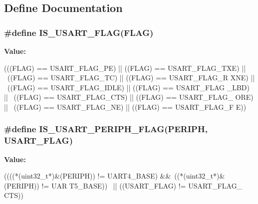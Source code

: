 \subsection{Define Documentation}
\hypertarget{group__USART__Flags_ga3e20747ce7c97a36718933c0cb3dac29}{
\subsubsection[{IS\_\-USART\_\-FLAG}]{\setlength{\rightskip}{0pt plus 5cm}\#define IS\_\-USART\_\-FLAG(FLAG)}}
\label{group__USART__Flags_ga3e20747ce7c97a36718933c0cb3dac29}
{\bfseries Value:}
\begin{DoxyCode}
(((FLAG) == USART_FLAG_PE) || ((FLAG) == USART_FLAG_TXE) || \
                             ((FLAG) == USART_FLAG_TC) || ((FLAG) == USART_FLAG_R
      XNE) || \
                             ((FLAG) == USART_FLAG_IDLE) || ((FLAG) == USART_FLAG
      _LBD) || \
                             ((FLAG) == USART_FLAG_CTS) || ((FLAG) == USART_FLAG_
      ORE) || \
                             ((FLAG) == USART_FLAG_NE) || ((FLAG) == USART_FLAG_F
      E))
\end{DoxyCode}
\hypertarget{group__USART__Flags_gad8395894e77b07a0713756b355aa22e5}{
\subsubsection[{IS\_\-USART\_\-PERIPH\_\-FLAG}]{\setlength{\rightskip}{0pt plus 5cm}\#define IS\_\-USART\_\-PERIPH\_\-FLAG(PERIPH, \/  USART\_\-FLAG)}}
\label{group__USART__Flags_gad8395894e77b07a0713756b355aa22e5}
{\bfseries Value:}
\begin{DoxyCode}
((((*(uint32_t*)&(PERIPH)) != UART4_BASE) &&\
                                                  ((*(uint32_t*)&(PERIPH)) != UAR
      T5_BASE)) \
                                                  || ((USART_FLAG) != USART_FLAG_
      CTS))
\end{DoxyCode}
